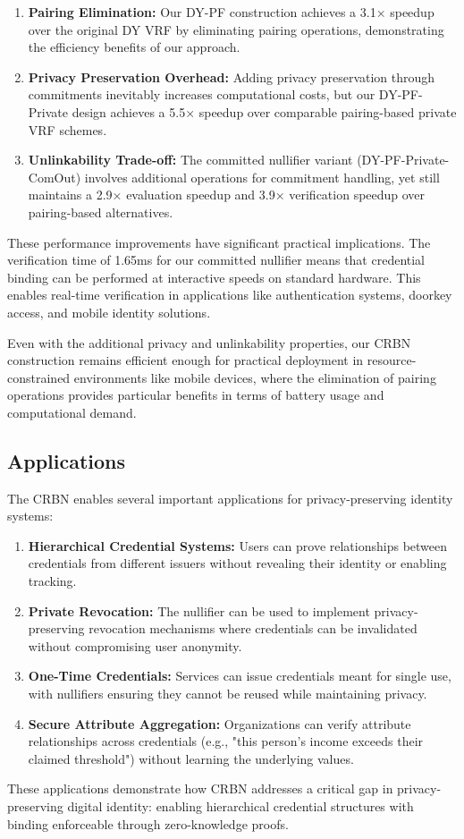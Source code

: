 \begin{enumerate}
    \item \textbf{Pairing Elimination:} Our DY-PF construction achieves a 3.1× speedup over the original DY VRF by eliminating pairing operations, demonstrating the efficiency benefits of our approach.
    
    \item \textbf{Privacy Preservation Overhead:} Adding privacy preservation through commitments inevitably increases computational costs, but our DY-PF-Private design achieves a 5.5× speedup over comparable pairing-based private VRF schemes.
    
    \item \textbf{Unlinkability Trade-off:} The committed nullifier variant (DY-PF-Private-ComOut) involves additional operations for commitment handling, yet still maintains a 2.9× evaluation speedup and 3.9× verification speedup over pairing-based alternatives.
\end{enumerate}

These performance improvements have significant practical implications. The verification time of 1.65ms for our committed nullifier means that credential binding can be performed at interactive speeds on standard hardware. This enables real-time verification in applications like authentication systems, doorkey access, and mobile identity solutions.

Even with the additional privacy and unlinkability properties, our CRBN construction remains efficient enough for practical deployment in resource-constrained environments like mobile devices, where the elimination of pairing operations provides particular benefits in terms of battery usage and computational demand.

\subsection{Applications}

The CRBN enables several important applications for privacy-preserving identity systems:

\begin{enumerate}
    \item \textbf{Hierarchical Credential Systems:} Users can prove relationships between credentials from different issuers without revealing their identity or enabling tracking.
    
    \item \textbf{Private Revocation:} The nullifier can be used to implement privacy-preserving revocation mechanisms where credentials can be invalidated without compromising user anonymity.
    
    \item \textbf{One-Time Credentials:} Services can issue credentials meant for single use, with nullifiers ensuring they cannot be reused while maintaining privacy.
    
    \item \textbf{Secure Attribute Aggregation:} Organizations can verify attribute relationships across credentials (e.g., "this person's income exceeds their claimed threshold") without learning the underlying values.
\end{enumerate}

These applications demonstrate how CRBN addresses a critical gap in privacy-preserving digital identity: enabling hierarchical credential structures with binding enforceable through zero-knowledge proofs.

